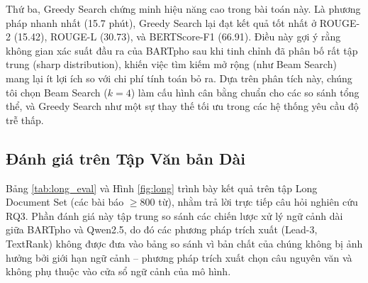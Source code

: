 \documentclass{article}
\begin{document}
Thứ ba, Greedy Search chứng minh hiệu năng cao trong bài toán này. Là phương pháp nhanh nhất (15.7 phút), Greedy Search lại đạt kết quả tốt nhất ở ROUGE-2 (15.42), ROUGE-L (30.73), và BERTScore-F1 (66.91). Điều này gợi ý rằng không gian xác suất đầu ra của BARTpho sau khi tinh chỉnh đã phân bố rất tập trung (sharp distribution), khiến việc tìm kiếm mở rộng (như Beam Search) mang lại ít lợi ích so với chi phí tính toán bỏ ra. Dựa trên phân tích này, chúng tôi chọn Beam Search ($k=4$) làm cấu hình cân bằng chuẩn cho các so sánh tổng thể, và Greedy Search như một sự thay thế tối ưu trong các hệ thống yêu cầu độ trễ thấp.



\subsection{Đánh giá trên Tập Văn bản Dài}

Bảng \ref{tab:long_eval} và Hình \ref{fig:long} trình bày kết quả trên tập Long Document Set (các bài báo $\geq 800$ từ), nhằm trả lời trực tiếp câu hỏi nghiên cứu RQ3. Phần đánh giá này tập trung so sánh các chiến lược xử lý ngữ cảnh dài giữa BARTpho và Qwen2.5, do đó các phương pháp trích xuất (Lead-3, TextRank) không được đưa vào bảng so sánh vì bản chất của chúng không bị ảnh hưởng bởi giới hạn ngữ cảnh -- phương pháp trích xuất chọn câu nguyên văn và không phụ thuộc vào cửa sổ ngữ cảnh của mô hình.

\begin{table}[htbp]
\centering
  \caption{Kết quả đánh giá trên tập văn bản dài (Long Document Set, bài báo $\geq 800$ từ, $n = 69$). Giá trị in đậm biểu thị kết quả tốt nhất trên từng cột.}
  \label{tab:long_eval}
\end{table}
\end{document}
